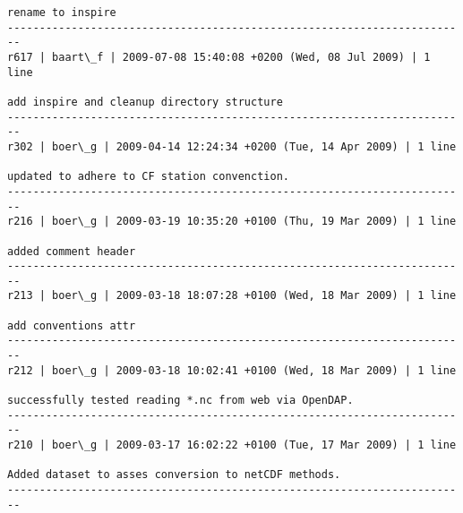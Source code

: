 \documentclass[9]{report}
\begin{document}
\begin{description}
\begin{verbatim}
rename to inspire
------------------------------------------------------------------------
r617 | baart\_f | 2009-07-08 15:40:08 +0200 (Wed, 08 Jul 2009) | 1 line

add inspire and cleanup directory structure
------------------------------------------------------------------------
r302 | boer\_g | 2009-04-14 12:24:34 +0200 (Tue, 14 Apr 2009) | 1 line

updated to adhere to CF station convenction.
------------------------------------------------------------------------
r216 | boer\_g | 2009-03-19 10:35:20 +0100 (Thu, 19 Mar 2009) | 1 line

added comment header
------------------------------------------------------------------------
r213 | boer\_g | 2009-03-18 18:07:28 +0100 (Wed, 18 Mar 2009) | 1 line

add conventions attr
------------------------------------------------------------------------
r212 | boer\_g | 2009-03-18 10:02:41 +0100 (Wed, 18 Mar 2009) | 1 line

successfully tested reading *.nc from web via OpenDAP.
------------------------------------------------------------------------
r210 | boer\_g | 2009-03-17 16:02:22 +0100 (Tue, 17 Mar 2009) | 1 line

Added dataset to asses conversion to netCDF methods.
------------------------------------------------------------------------


\end{verbatim}
\end{description}
\end{document}
